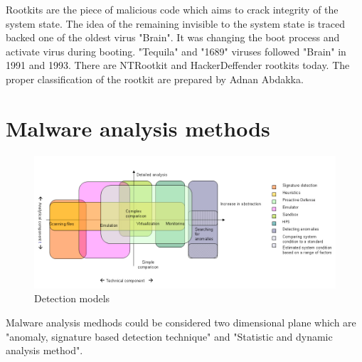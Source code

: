 Rootkits are the piece of malicious code which aims to crack integrity of the system state. The idea of the remaining invisible to the system state is traced backed one of the oldest virus "Brain"\cite{martin2008}. It was changing the boot process and activate virus during booting. "Tequila" and "1689" viruses followed "Brain" in 1991 and 1993\cite{Ducklin1991}. There are NTRootkit and HackerDeffender rootkits today. The proper classification of the rootkit are prepared by Adnan Abdakka\cite{Adnan2011}.



\section{Malware analysis methods}

\begin{figure}[h]
    \centering
    \includegraphics[width=1\textwidth]{img/alisa_1007_pic1_en.jpg}
    \caption{Detection models \cite{Shevchenko2007detc}}
    \label{fig:awesome_image}
\end{figure}
Malware analysis medhods could be considered two dimensional plane which are "anomaly, signature based detection technique" and "Statistic and dynamic analysis method". 



